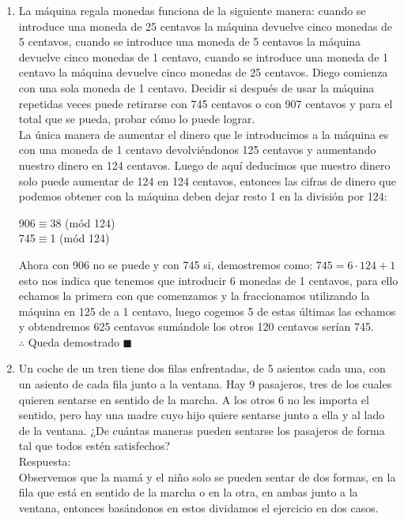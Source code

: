 \documentclass{book}
\begin{document}
\begin{enumerate}
    \item La máquina regala monedas funciona de la siguiente manera: cuando se introduce una moneda de 25 centavos la máquina devuelve cinco monedas de 5 centavos, cuando se introduce una moneda de 5 centavos la máquina devuelve cinco monedas de 1 centavo, cuando se introduce una moneda de 1 centavo la máquina devuelve cinco monedas de 25 centavos. Diego comienza con una sola moneda de 1 centavo. Decidir si después de usar la máquina repetidas veces puede retirarse con 745 centavos o con 907 centavos y para el total que se pueda, probar cómo lo puede lograr.\\
          La única manera de aumentar el dinero que le introducimos a la máquina es con una moneda de 1 centavo devolviéndonos 125 centavos y aumentando nuestro dinero en 124 centavos. Luego de aquí deducimos que nuestro dinero solo puede aumentar de 124 en 124 centavos, entonces las cifras de dinero que podemos obtener con la máquina deben dejar resto 1 en la división por 124:
          \begin{center}
              906$\equiv$38 (mód 124)\\
              745$\equiv$1 (mód 124)
          \end{center}
          Ahora con 906 no se puede y con 745 si, demostremos como: $745=6\cdot 124+1$ esto nos indica que tenemos que introducir 6 monedas de 1 centavos, para ello echamos la primera con que comenzamos y la fraccionamos utilizando la máquina en 125 de a 1 centavo, luego cogemos 5 de estas últimas las echamos y obtendremos 625 centavos sumándole los otros 120 centavos serían 745. \\$\therefore$ Queda demostrado $\blacksquare$\\
    \item Un coche de un tren tiene dos filas enfrentadas, de 5 asientos cada una, con un asiento de cada fila junto a la ventana. Hay 9 pasajeros, tres de los cuales quieren sentarse en sentido de la marcha. A los otros 6 no les importa el sentido, pero hay una madre cuyo hijo quiere sentarse junto a ella y al lado de la ventana. ¿De cuántas maneras pueden sentarse los pasajeros de forma tal que todos estén satisfechos?\\
          Respuesta:\\
          Observemos que la mamá y el niño solo se pueden sentar de dos formas, en la fila que está en sentido de la marcha o en la otra, en ambas junto a la ventana, entonces basándonos en estos dividamos el ejercicio en dos casos.\\

\end{enumerate}
\end{document}
